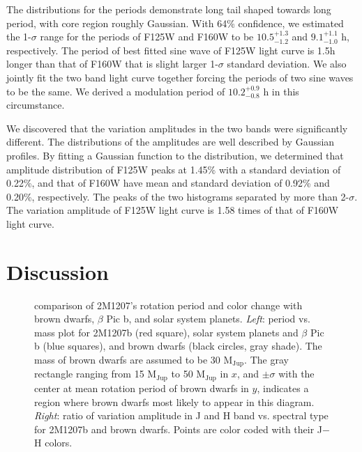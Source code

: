 \documentclass[apj]{emulateapj}
\newcommand{\bpic}{$\beta$ Pic}
\newcommand{\mjup}{M$_{\mbox{Jup}}$}
\begin{document}

The distributions for the periods demonstrate long tail shaped towards
long period, with core region roughly Gaussian. With 64\% confidence,
we estimated the 1-$\sigma$ range for the periods of F125W and F160W
to be $10.5_{-1.2}^{+1.3}$ and $9.1_{-1.0}^{+1.1}$ h,
respectively. The period of best fitted sine wave of F125W light
curve is 1.5h longer than that of F160W  that is slight larger
1-$\sigma$ standard deviation. We also jointly fit the two band light
curve together forcing the periods of two sine waves to be the
same. We derived a modulation period of $10.2^{+0.9}_{-0.8}$ h in this
circumstance. 

We discovered that  the variation amplitudes in the two bands were significantly
different. The distributions of the amplitudes are well described by
Gaussian profiles. By fitting a Gaussian function to the distribution, we
determined that amplitude distribution of F125W peaks at 1.45\% with a
standard deviation of 0.22\%, and that of F160W have mean and standard
deviation of 0.92\% and 0.20\%, respectively. The peaks of the two
histograms separated by more than 2-$\sigma$. The variation amplitude
of F125W light curve is 1.58 times of that of F160W light curve.




\section{Discussion}

\begin{figure}
  \centering
  \caption{comparison of 2M1207's rotation period and color change with brown
    dwarfs, \bpic{} b, and solar system planets. {\em Left}: period vs. mass
  plot for 2M1207b (red square), solar system planets and \bpic{} b
  (blue squares), and brown dwarfs (black circles, gray shade). The mass of brown
  dwarfs are assumed to be 30 \mjup{}. The gray rectangle
  ranging from 15 \mjup{} to 50 \mjup{} in $x$, and $\pm\sigma$
  with the center at mean rotation period of brown dwarfs in $y$, indicates a
region where brown dwarfs most likely to appear in this diagram. {\em Right}: ratio
of variation amplitude in J and H band vs. spectral type for 2M1207b
and brown dwarfs. Points are
color coded with their J$-$H colors. }
  \label{fig:5}
\end{figure}
\end{document}
